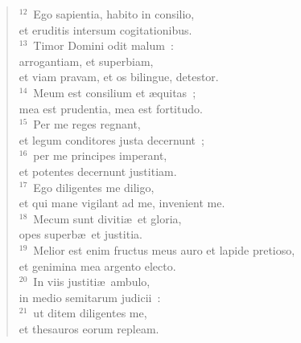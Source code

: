 \begin{flushleft}\begin{verse}${}^{12}$~Ego sapientia, habito in consilio,\\ et eruditis intersum cogitationibus.\\
${}^{13}$~Timor Domini odit malum~:\\ arrogantiam, et superbiam,\\ et viam pravam, et os bilingue, detestor.\\
${}^{14}$~Meum est consilium et \ae quitas~;\\ mea est prudentia, mea est fortitudo.\\
${}^{15}$~Per me reges regnant,\\ et legum conditores justa decernunt~;\\
${}^{16}$~per me principes imperant,\\ et potentes decernunt justitiam.\\
${}^{17}$~Ego diligentes me diligo,\\ et qui mane vigilant ad me, invenient me.\\
${}^{18}$~Mecum sunt diviti\ae\ et gloria,\\ opes superb\ae\ et justitia.\\
${}^{19}$~Melior est enim fructus meus auro et lapide pretioso,\\ et genimina mea argento electo.\\
${}^{20}$~In viis justiti\ae\ ambulo,\\ in medio semitarum judicii~:\\
${}^{21}$~ut ditem diligentes me,\\ et thesauros eorum repleam.\end{verse}\end{flushleft}


